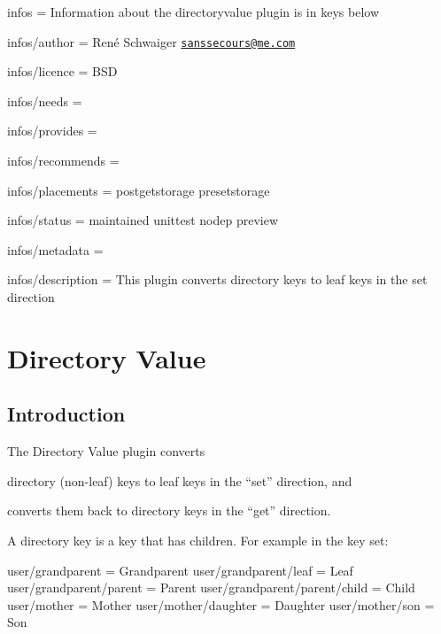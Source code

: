 
\begin{DoxyItemize}
\item infos = Information about the directoryvalue plugin is in keys below
\item infos/author = René Schwaiger \href{mailto:sanssecours@me.com}{\tt sanssecours@me.\+com}
\item infos/licence = B\+SD
\item infos/needs =
\item infos/provides =
\item infos/recommends =
\item infos/placements = postgetstorage presetstorage
\item infos/status = maintained unittest nodep preview
\item infos/metadata =
\item infos/description = This plugin converts directory keys to leaf keys in the set direction
\end{DoxyItemize}\hypertarget{autotoc_md172_src_plugins_directoryvalue_README_md}{}\section{Directory Value}\label{autotoc_md172_src_plugins_directoryvalue_README_md}
\hypertarget{autotoc_md172_autotoc_md173}{}\subsection{Introduction}\label{autotoc_md172_autotoc_md173}
The Directory Value plugin converts


\begin{DoxyEnumerate}
\item directory (non-\/leaf) keys to leaf keys in the “set” direction, and
\item converts them back to directory keys in the “get” direction.
\end{DoxyEnumerate}

A directory key is a key that has children. For example in the key set\+:


\begin{DoxyCode}
user/grandparent                = Grandparent
user/grandparent/leaf           = Leaf
user/grandparent/parent         = Parent
user/grandparent/parent/child   = Child
user/mother                     = Mother
user/mother/daughter            = Daughter
user/mother/son                 = Son
\end{DoxyCode}


